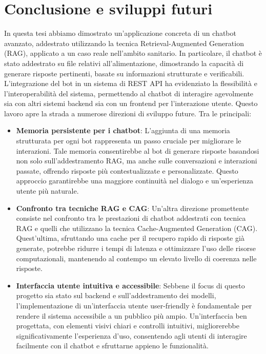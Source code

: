 \documentclass[a4paper,twoside,12pt]{toptesi}
\begin{document}
\chapter{Conclusione e sviluppi futuri}
In questa tesi abbiamo dimostrato un'applicazione concreta di un chatbot avanzato, addestrato utilizzando la tecnica Retrieval-Augmented Generation (RAG), applicato a un caso reale nell'ambito sanitario. In particolare, il chatbot è stato addestrato su file relativi all'alimentazione, dimostrando la capacità di generare risposte pertinenti, basate su informazioni strutturate e verificabili. L'integrazione del bot in un sistema di REST API ha evidenziato la flessibilità e l'interoperabilità del sistema, permettendo al chatbot di interagire agevolmente sia con altri sistemi backend sia con un frontend per l'interazione utente. Questo lavoro apre la strada a numerose direzioni di sviluppo future. Tra le principali:
\begin{itemize}
\item \textbf{Memoria persistente per i chatbot}: L'aggiunta di una memoria strutturata per ogni bot rappresenta un passo cruciale per migliorare le interazioni. Tale memoria consentirebbe al bot di generare risposte basandosi non solo sull'addestramento RAG, ma anche sulle conversazioni e interazioni passate, offrendo risposte più contestualizzate e personalizzate. Questo approccio garantirebbe una maggiore continuità nel dialogo e un'esperienza utente più naturale.
\item \textbf{Confronto tra tecniche RAG e CAG}: Un'altra direzione promettente consiste nel confronto tra le prestazioni di chatbot addestrati con tecnica RAG e quelli che utilizzano la tecnica Cache-Augmented Generation (CAG). Quest'ultima, sfruttando una cache per il recupero rapido di risposte già generate, potrebbe ridurre i tempi di latenza e ottimizzare l'uso delle risorse computazionali, mantenendo al contempo un elevato livello di coerenza nelle risposte.
\item \textbf{Interfaccia utente intuitiva e accessibile}: Sebbene il focus di questo progetto sia stato sul backend e sull'addestramento dei modelli, l'implementazione di un'interfaccia utente user-friendly è fondamentale per rendere il sistema accessibile a un pubblico più ampio. Un'interfaccia ben progettata, con elementi visivi chiari e controlli intuitivi, migliorerebbe significativamente l'esperienza d'uso, consentendo agli utenti di interagire facilmente con il chatbot e sfruttarne appieno le funzionalità.
\end{itemize}
\end{document}
